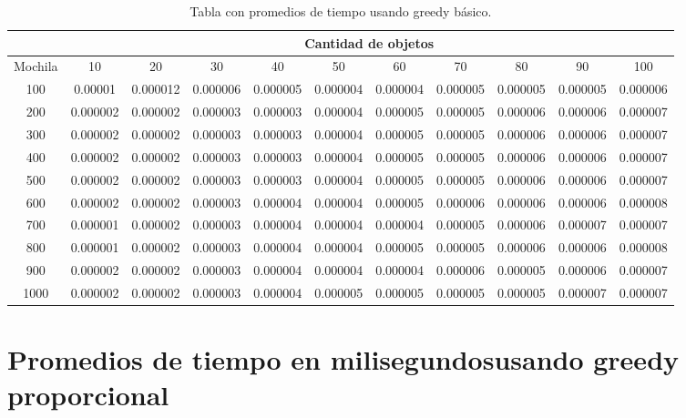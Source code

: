 \documentclass[a4paper]{article}
\begin{document}
\begin{table}[H]
\centering
\relax
\resizebox{\textwidth}{!} {%
\begin{tabular}{|c|c|c|c|c|c|c|c|c|c|c|}
\cline{2-11}
 \multicolumn{1}{c}{} & \multicolumn{10}{|c|}{\textbf{Cantidad de objetos}} \\
\hline
Mochila & 10 & 20 & 30 & 40 & 50 & 60 & 70 & 80 & 90 & 100 \\
\hline
\hline
100 & 0.00001 & 0.000012 & 0.000006 & 0.000005 & 0.000004 & 0.000004 & 0.000005 & 0.000005 & 0.000005 & 0.000006 \\
\hline
\hline
200 & 0.000002 & 0.000002 & 0.000003 & 0.000003 & 0.000004 & 0.000005 & 0.000005 & 0.000006 & 0.000006 & 0.000007 \\
\hline
\hline
300 & 0.000002 & 0.000002 & 0.000003 & 0.000003 & 0.000004 & 0.000005 & 0.000005 & 0.000006 & 0.000006 & 0.000007 \\
\hline
\hline
400 & 0.000002 & 0.000002 & 0.000003 & 0.000003 & 0.000004 & 0.000005 & 0.000005 & 0.000006 & 0.000006 & 0.000007 \\
\hline
\hline
500 & 0.000002 & 0.000002 & 0.000003 & 0.000003 & 0.000004 & 0.000005 & 0.000005 & 0.000006 & 0.000006 & 0.000007 \\
\hline
\hline
600 & 0.000002 & 0.000002 & 0.000003 & 0.000004 & 0.000004 & 0.000005 & 0.000006 & 0.000006 & 0.000006 & 0.000008 \\
\hline
\hline
700 & 0.000001 & 0.000002 & 0.000003 & 0.000004 & 0.000004 & 0.000004 & 0.000005 & 0.000006 & 0.000007 & 0.000007 \\
\hline
\hline
800 & 0.000001 & 0.000002 & 0.000003 & 0.000004 & 0.000004 & 0.000005 & 0.000005 & 0.000006 & 0.000006 & 0.000008 \\
\hline
\hline
900 & 0.000002 & 0.000002 & 0.000003 & 0.000004 & 0.000004 & 0.000004 & 0.000006 & 0.000005 & 0.000006 & 0.000007 \\
\hline
\hline
1000 & 0.000002 & 0.000002 & 0.000003 & 0.000004 & 0.000005 & 0.000005 & 0.000005 & 0.000005 & 0.000007 & 0.000007 \\
\hline
\end{tabular}%
}
\caption{Tabla con promedios de tiempo usando greedy básico.}
\end{table}
\section{Promedios de tiempo en milisegundosusando greedy proporcional}
\end{document}
